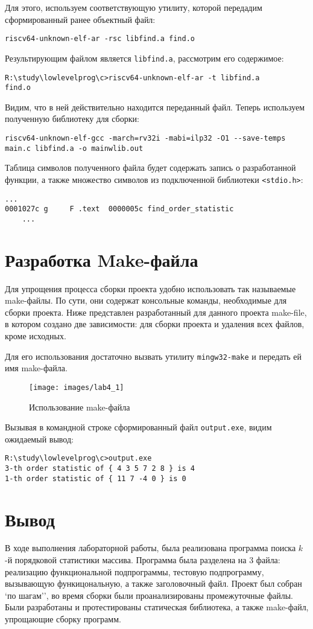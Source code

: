     Для этого, используем соответствующую утилиту, которой передадим сформированный ранее объектный файл:
    \begin{Verbatim}[breaklines=true]
riscv64-unknown-elf-ar -rsc libfind.a find.o
    \end{Verbatim}
    Результирующим файлом является \verb|libfind.a|, рассмотрим его содержимое:
    \begin{Verbatim}[breaklines=true]
R:\study\lowlevelprog\c>riscv64-unknown-elf-ar -t libfind.a
find.o
    \end{Verbatim}
    Видим, что в ней действительно находится переданный файл. Теперь используем полученную библиотеку для сборки:
    \begin{Verbatim}[breaklines=true]
riscv64-unknown-elf-gcc -march=rv32i -mabi=ilp32 -O1 --save-temps main.c libfind.a -o mainwlib.out
    \end{Verbatim}
    Таблица символов полученного файла будет содержать запись о разработанной функции, а также множество символов из подключенной библиотеки \verb|<stdio.h>|:
    \begin{Verbatim}[breaklines=true]
    ...
0001027c g     F .text	0000005c find_order_statistic
    ...
    \end{Verbatim}
    \section{Разработка Make-файла}\label{sec:makedev}
    Для упрощения процесса сборки проекта удобно использовать так называемые make-файлы. По сути, они содержат консольные команды, необходимые для сборки проекта.
    Ниже представлен разработанный для данного проекта make-file, в котором создано две зависимости: для сборки проекта и удаления всех файлов, кроме исходных.
    
    Для его использования достаточно вызвать утилиту \verb|mingw32-make| и передать ей имя make-файла.
    \begin{figure}[H]
        \centering
        \texttt{[image: images/lab4\_1]}
        \caption{Использование make-файла}
        \label{fig:makefileusage}
    \end{figure}

    \newpage
    Вызывая в командной строке сформированный файл \verb|output.exe|, видим ожидаемый вывод:
    \begin{Verbatim}[breaklines=true]
R:\study\lowlevelprog\c>output.exe
3-th order statistic of { 4 3 5 7 2 8 } is 4
1-th order statistic of { 11 7 -4 0 } is 0
    \end{Verbatim}
    \section{Вывод}\label{sec:end}
    В ходе выполнения лабораторной работы, была реализована программа поиска $k$-й порядковой статистики массива.
    Программа была разделена на 3 файла: реализацию функциональной подпрограммы, тестовую подпрограмму, вызывающую функицональную, а также заголовочный файл.
    Проект был собран `по шагам'', во время сборки были проанализированы промежуточные файлы.
    Были разработаны и протестированы статическая библиотека, а также make-файл, упрощающие сборку программ.
